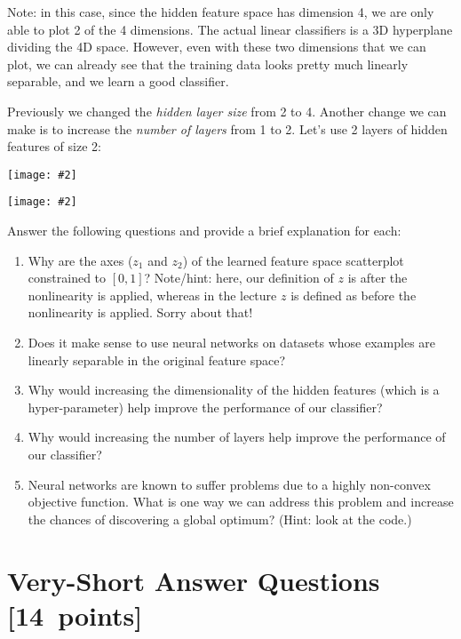 \documentclass{article}
\newcommand{\blu}[1]{{\textcolor{blu}{#1}}}
\let\ask\blu
\newcommand\pts[1]{\textcolor{pointscolour}{[#1~points]}}
\newcommand{\centerfig}[2]{\begin{center}\texttt{[image: \#2]}\end{center}}
\begin{document}
Note: in this case, since the hidden feature space has dimension 4, we are only able to plot 2 of the 4 dimensions. The actual linear classifiers is a 3D hyperplane dividing the 4D space. However, even with these two dimensions that we can plot, we can already see that the training data looks pretty much linearly separable, and we learn a good classifier.

Previously we changed the \emph{hidden layer size} from 2 to 4. Another change we can make is to increase the \emph{number of layers} from 1 to 2. Let's use 2 layers of hidden features of size 2:

\centerfig{.7}{./figs/sinusoids_decision_boundary_[2, 2]_2.png}
\centerfig{.7}{./figs/sinusoids_linear_boundary_[2, 2]_2.png}

\ask{Answer the following questions and provide a brief explanation for each:}

\begin{enumerate}
	\item Why are the axes ($z_1$ and $z_2$) of the learned feature space scatterplot constrained to $[0, 1]$? Note/hint: here, our definition of $z$ is after the nonlinearity is applied, whereas in the lecture $z$ is defined as before the nonlinearity is applied. Sorry about that!
	\item Does it make sense to use neural networks on datasets whose examples are linearly separable in the original feature space?
	\item Why would increasing the dimensionality of the hidden features (which is a hyper-parameter) help improve the performance of our classifier?
	\item Why would increasing the number of layers help improve the performance of our classifier?
	\item Neural networks are known to suffer problems due to a highly non-convex objective function. What is one way we can address this problem and increase the chances of discovering a global optimum? (Hint: look at the code.)
\end{enumerate}


\section{Very-Short Answer Questions \pts{14}}
\end{document}
